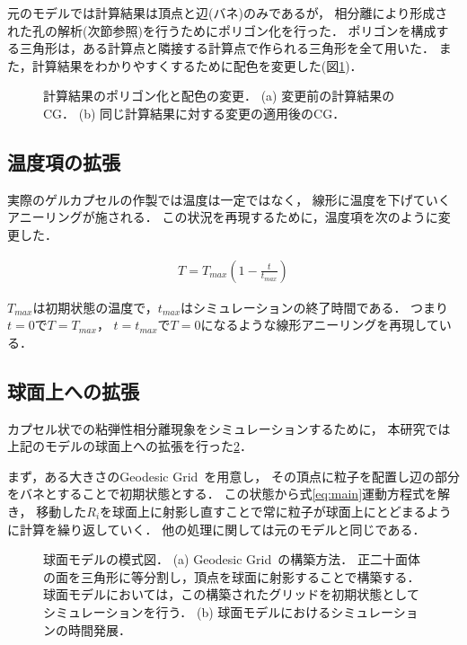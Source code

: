 元のモデルでは計算結果は頂点と辺(バネ)のみであるが，
相分離により形成された孔の解析(次節参照)を行うためにポリゴン化を行った．
ポリゴンを構成する三角形は，ある計算点と隣接する計算点で作られる三角形を全て用いた．
また，計算結果をわかりやすくするために配色を変更した(図\ref{fig:model_2d})．

\begin{figure}
\centering

\caption{
    計算結果のポリゴン化と配色の変更．
    (a) 変更前の計算結果のCG．
    (b) 同じ計算結果に対する変更の適用後のCG．
}
\label{fig:model_2d}
\end{figure}


\subsection{温度項の拡張}
実際のゲルカプセルの作製では温度は一定ではなく，
線形に温度を下げていくアニーリングが施される．
この状況を再現するために，温度項を次のように変更した．

\begin{eqnarray}
\label{eq:thermal}
T = T_{max}(1-\frac{t}{t_{max}})
\end{eqnarray}

$T_{max}$は初期状態の温度で，$t_{max}$はシミュレーションの終了時間である．
つまり$t=0$で$T=T_{max}$，
$t=t_{max}$で$T=0$になるような線形アニーリングを再現している．


\subsection{球面上への拡張}
カプセル状での粘弾性相分離現象をシミュレーションするために，
本研究では上記のモデルの球面上への拡張を行った\ref{fig:model_sphere}．

まず，ある大きさのGeodesic Grid~\cite{Geodesic}を用意し，
その頂点に粒子を配置し辺の部分をバネとすることで初期状態とする．
この状態から式\ref{eq:main}運動方程式を解き，
移動した$R_i$を球面上に射影し直すことで常に粒子が球面上にとどまるように計算を繰り返していく．
他の処理に関しては元のモデルと同じである．

\begin{figure}
\centering

\caption{
    球面モデルの模式図．
    (a) Geodesic Grid~\cite{Geodesic}の構築方法．
        正二十面体の面を三角形に等分割し，頂点を球面に射影することで構築する．
        球面モデルにおいては，この構築されたグリッドを初期状態としてシミュレーションを行う．
    (b) 球面モデルにおけるシミュレーションの時間発展．
}
\label{fig:model_sphere}
\end{figure}



